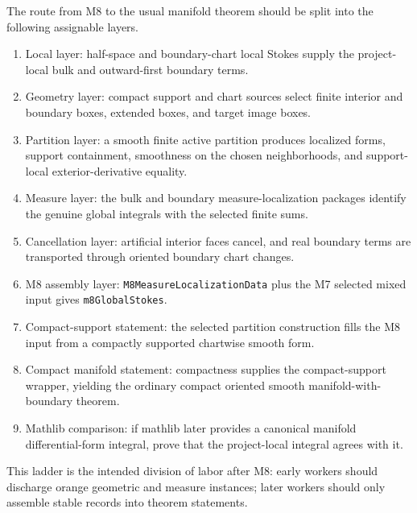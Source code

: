 \begin{theorem}
  \label{anc:m8_to_manifold_dependency_ladder}
  \begingroup\raggedright
  The route from M8 to the usual manifold theorem should be split into the
  following assignable layers.
  \begin{enumerate}
    \item Local layer: half-space and boundary-chart local Stokes supply the
      project-local bulk and outward-first boundary terms.
    \item Geometry layer: compact support and chart sources select finite
      interior and boundary boxes, extended boxes, and target image boxes.
    \item Partition layer: a smooth finite active partition produces localized
      forms, support containment, smoothness on the chosen neighborhoods, and
      support-local exterior-derivative equality.
    \item Measure layer: the bulk and boundary measure-localization packages
      identify the genuine global integrals with the selected finite sums.
    \item Cancellation layer: artificial interior faces cancel, and real
      boundary terms are transported through oriented boundary chart changes.
    \item M8 assembly layer: \texttt{M8MeasureLocalizationData} plus the M7
      selected mixed input gives \texttt{m8GlobalStokes}.
    \item Compact-support statement: the selected partition construction fills
      the M8 input from a compactly supported chartwise smooth form.
    \item Compact manifold statement: compactness supplies the compact-support
      wrapper, yielding the ordinary compact oriented smooth
      manifold-with-boundary theorem.
    \item Mathlib comparison: if mathlib later provides a canonical manifold
      differential-form integral, prove that the project-local integral agrees
      with it.
  \end{enumerate}
  This ladder is the intended division of labor after M8: early workers should
  discharge orange geometric and measure instances; later workers should only
  assemble stable records into theorem statements.
  \par\endgroup
\end{theorem}

\endgroup
